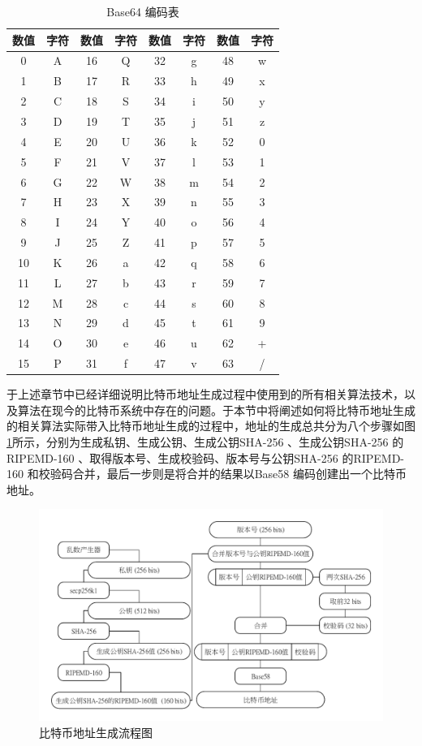 					\begin{table}[!htb]
					\centering
					\caption{Base64 编码表}
					\label{Base64}
					\begin{tabular}{|c|c|c|c|c|c|c|c|}
					\hline
					数值 & 字符 & 数值 & 字符 & 数值 & 字符 & 数值 & 字符 \\ \hline
					0 & A & 16 & Q & 32 & g & 48 & w \\ \hline
					1 & B & 17 & R & 33 & h & 49 & x \\ \hline
					2 & C & 18 & S & 34 & i & 50 & y \\ \hline
					3 & D & 19 & T & 35 & j & 51 & z \\ \hline
					4 & E & 20 & U & 36 & k & 52 & 0 \\ \hline
					5 & F & 21 & V & 37 & l & 53 & 1 \\ \hline
					6 & G & 22 & W & 38 & m & 54 & 2 \\ \hline
					7 & H & 23 & X & 39 & n & 55 & 3 \\ \hline
					8 & I & 24 & Y & 40 & o & 56 & 4 \\ \hline
					9 & J & 25 & Z & 41 & p & 57 & 5 \\ \hline
					10 & K & 26 & a & 42 & q & 58 & 6 \\ \hline
					11 & L & 27 & b & 43 & r & 59 & 7 \\ \hline
					12 & M & 28 & c & 44 & s & 60 & 8 \\ \hline
					13 & N & 29 & d & 45 & t & 61 & 9 \\ \hline
					14 & O & 30 & e & 46 & u & 62 & + \\ \hline
					15 & P & 31 & f & 47 & v & 63 & / \\ \hline
					\end{tabular}
					\end{table}
			于上述章节中已经详细说明⽐特币地址⽣成过程中使⽤到的所有相关算法技术，以及算法在现今的⽐特币系统中存在的问题。于本节中将阐述如何将比特币地址生成的相关算法实际带入比特币地址生成的过程中，地址的生成总共分为八个步骤如图\ref{address}所示，分别为生成私钥、生成公钥、生成公钥SHA-256 、生成公钥SHA-256 的RIPEMD-160 、取得版本号、生成校验码、版本号与公钥SHA-256 的RIPEMD-160 和校验码合并，最后一步则是将合并的结果以Base58 编码创建出一个比特币地址。

			\begin{figure}[!htb]
					\centering
					\includegraphics[width = .9\textwidth]{address.pdf}
					\caption{比特币地址生成流程图}\label{address}
			\end{figure}


